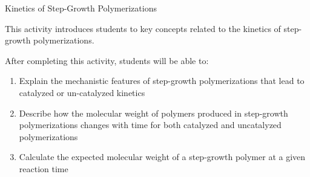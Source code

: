 %
%
%
%

\renewcommand{\figpath}{content/polymchem/stepgrowth/kinetics/figs}
\renewcommand{\labelbase}{step-kinetics}

\begin{activity}{Kinetics of Step-Growth Polymerizations}

\begin{instructornotes}

	This activity introduces students to key concepts related to the kinetics of step-growth polymerizations.
	
	After completing this activity, students will be able to:
			\begin{enumerate}
				\item Explain the mechanistic features of step-growth polymerizations that lead to catalyzed or un-catalyzed kinetics
				\item Describe how the molecular weight of polymers produced in step-growth polymerizations changes with time for both catalyzed and uncatalyzed polymerizations
				\item Calculate the expected molecular weight of a step-growth polymer at a given reaction time
			\end{enumerate}
	
			

\end{instructornotes}
\end{activity}
